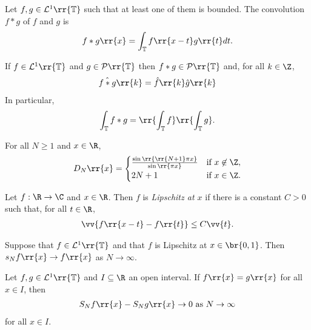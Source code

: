 \documentclass{article}
\begin{document}
\begin{definition}
  Let $f,g\in\mathcal L^1\rr{\mathbb T}$ such that at least one of them is bounded. The
  convolution $f * g$ of $f$ and $g$ is
  \begin{align*}
    f*g\rr{x}=\int_{\mathbb T} f\rr{x-t}g\rr{t}dt.
  \end{align*}
\end{definition}

\begin{proposition}
  If $f\in\mathcal L^1\rr{\mathbb T}$ and $g\in\mathcal P\rr{\mathbb T}$ then
  $f*g\in\mathcal P\rr{\mathbb T}$ and, for all $k\in\Z$,
  \begin{align*}
    \hat{f*g}\rr{k}=\hat f\rr{k}\hat g\rr{k}
  \end{align*}
  In particular,
  \begin{align*}
    \int_{\mathbb T} f * g = \rr{\int_{\mathbb T} f}\rr{\int_{\mathbb T} g}.
  \end{align*}
\end{proposition}

\begin{lemma}
  For all $N\geq 1$ and $x\in\R$,
  \begin{align*}
    D_N\rr{x} =
    \begin{cases}
      \frac{\sin\rr{\rr{N+1}\pi x}}{\sin\rr{\pi x}} & \text{if }x\not\in\Z,\\
      2N+1 &\text{if }x\in\Z.
    \end{cases}
  \end{align*}
\end{lemma}

\begin{definition}
  Let $f:\R\to\C$ and $x\in\R$. Then $f$ is \emph{Lipschitz at $x$} if there is a
  constant $C>0$ such that, for all $t\in\R$,
  \begin{align*}
    \vv{f\rr{x-t}-f\rr{t}}\leq C\vv{t}.
  \end{align*}
\end{definition}

\begin{theorem}
  Suppose that $f\in\mathcal L^1\rr{\mathbb T}$ and that $f$ is Lipschitz at $x\in\br{0,1}$.
  Then $s_N f\rr{x}\to f\rr{x}$ as $N\to\infty$.
\end{theorem}

\begin{theorem}
  Let $f,g\in\mathcal L^1\rr{\mathbb T}$ and $I\subseteq\R$ an open interval.
  If $f\rr{x}=g\rr{x}$ for all $x\in I$, then
  \begin{align*}
    S_N f\rr{x}-S_N g\rr{x}\to 0 \text{ as } N\to\infty
  \end{align*}
  for all $x\in I$.
\end{theorem}
\end{document}
